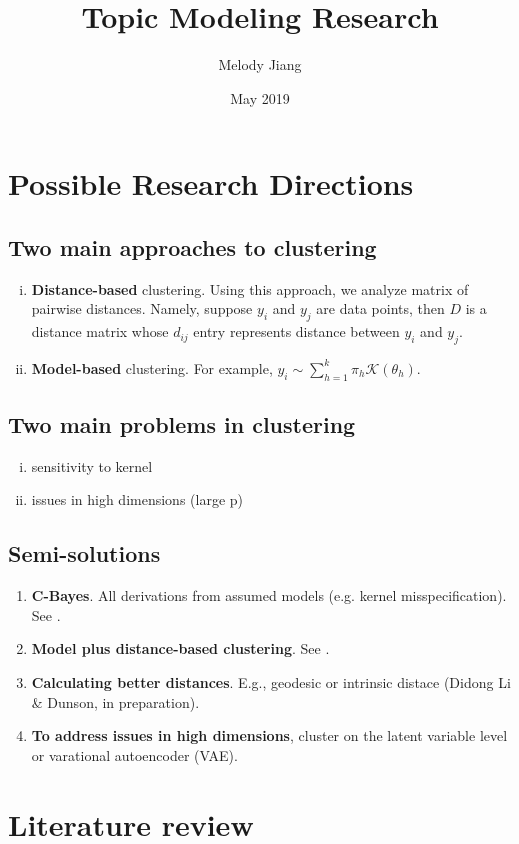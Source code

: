 \documentclass{article}
\title{Topic Modeling Research}
\author{Melody Jiang}
\date{May 2019}
\begin{document}
\maketitle



\section{Possible Research Directions}


\subsection{Two main approaches to clustering}

\begin{enumerate}[(i)]
  \item \textbf{Distance-based} clustering. Using this approach, we analyze matrix of pairwise distances. Namely, suppose $y_i$ and $y_j$ are data points, then $D$ is a distance matrix whose $d_{ij}$ entry represents distance between $y_i$ and $y_j$.
  \item \textbf{Model-based} clustering. For example, $y_i \sim \sum_{h = 1}^k \pi_h \mathcal{K}(\theta_h)$.
\end{enumerate}


\subsection{Two main problems in clustering}

\begin{enumerate}[(i)]
  \item sensitivity to kernel
  \item issues in high dimensions (large p)
\end{enumerate}


\subsection{Semi-solutions}

\begin{enumerate}
  \item \textbf{C-Bayes}. All derivations from assumed models (e.g. kernel misspecification). See \cite{miller2018robust}.
  \item \textbf{Model plus distance-based clustering}.
  See \cite{duan2018bayesian}.
  \item \textbf{Calculating better distances}. E.g., geodesic or intrinsic distace (Didong Li \& Dunson, in preparation).
  \item \textbf{To address issues in high dimensions}, cluster on the latent variable level or varational autoencoder (VAE). 
\end{enumerate}



\section{Literature review}





\end{document}
